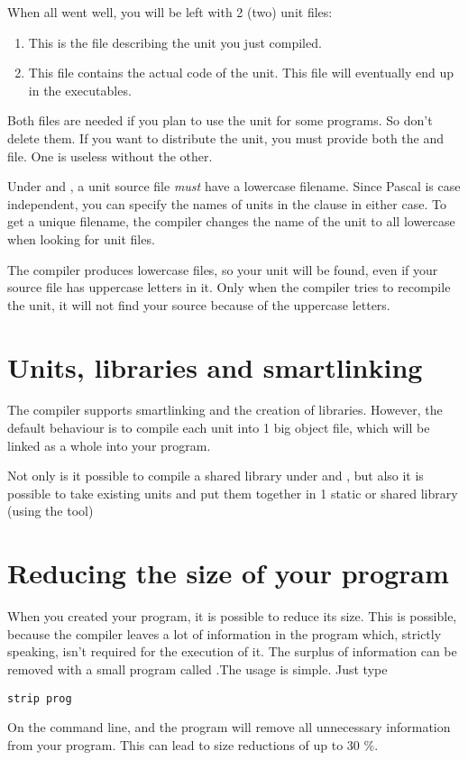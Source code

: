 When all went well, you will be left with 2 (two) unit files:
\begin{enumerate}
\item {} This is the file describing the unit you just
compiled.
\item {} This file contains the actual code of the unit.
This file will eventually end up in the executables.
\end{enumerate}
Both files are needed if you plan to use the unit for some programs.
So don't delete them. If you want to distribute the unit, you must
provide both the  and  file. One is useless without the
other.

\begin{remark}
Under \linux and \unix, a unit source file {\em must} have a lowercase filename.
Since Pascal is case independent, you can specify the names of units in the
 clause in either case. To get a unique filename, the \fpc compiler
changes the name of the unit to all lowercase when looking for unit files.
\end{remark}
The compiler produces lowercase files, so your unit will be found, even if
your source file has uppercase letters in it. Only when the compiler tries to
recompile the unit, it will not find your source because of the uppercase
letters.

\section{Units, libraries and smartlinking}
The \fpc compiler supports smartlinking and the creation of libraries.
However, the default behaviour is to compile each unit into 1 big object
file, which will be linked as a whole into your program.

Not only is it possible to compile a shared library under \windows and
\linux, but also it is possible to take existing units and put them
together in 1 static or shared library (using the  tool)

\section{Reducing the size of your program}

When you created your program, it is possible to reduce its size. This
is possible, because the compiler leaves a lot of information in the
program which, strictly speaking, isn't required for the execution of
it. The surplus of information can be removed with a small program
called .The usage is simple. Just type
\begin{verbatim}
strip prog
\end{verbatim}
On the command line, and the  program will remove all unnecessary
information from your program. This can lead to size reductions of up to
30 \%.

